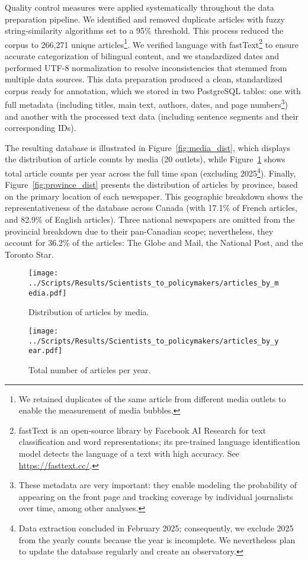 \documentclass[12pt]{article}
\begin{document}
Quality control measures were applied systematically throughout the data preparation pipeline. We identified and removed duplicate articles with fuzzy string-similarity algorithms set to a 95\% threshold. This process reduced the corpus to 266,271 unique articles\footnote{We retained duplicates of the same article from different media outlets to enable the measurement of media bubbles.}. We verified language with fastText\footnote{fastText is an open-source library by Facebook AI Research for text classification and word representations; its pre-trained language identification model detects the language of a text with high accuracy. See \url{https://fasttext.cc/}.} to ensure accurate categorization of bilingual content, and we standardized dates and performed UTF-8 normalization to resolve inconsistencies that stemmed from multiple data sources. This data preparation produced a clean, standardized corpus ready for annotation, which we stored in two PostgreSQL tables: one with full metadata (including titles, main text, authors, dates, and page numbers\footnote{These metadata are very important: they enable modeling the probability of appearing on the front page and tracking coverage by individual journalists over time, among other analyses.}) and another with the processed text data (including sentence segments and their corresponding IDs).

The resulting database is illustrated in Figure~\ref{fig:media_dist}, which displays the distribution of article counts by media (20 outlets), while Figure~\ref{fig:year_counts} shows total article counts per year across the full time span (excluding 2025\footnote{Data extraction concluded in February 2025; consequently, we exclude 2025 from the yearly counts because the year is incomplete. We nevertheless plan to update the database regularly and create an observatory.}). Finally, Figure~\ref{fig:province_dist} presents the distribution of articles by province, based on the primary location of each newspaper. This geographic breakdown shows the representativeness of the database across Canada (with 17.1\% of French articles, and 82.9\% of English articles). Three national newspapers are omitted from the provincial breakdown due to their pan-Canadian scope; nevertheless, they account for 36.2\% of the articles: The Globe and Mail, the National Post, and the Toronto Star.

\begin{figure}[!htbp]
  \centering
  \begin{minipage}[c]{0.48\textwidth}
    \centering
    \texttt{[image: ../Scripts/Results/Scientists\_to\_policymakers/articles\_by\_media.pdf]}
    \caption{Distribution of articles by media.}
    \label{fig:media_dist}
      \end{minipage}
  \hspace{0.02\textwidth}
  \begin{minipage}[c]{0.48\textwidth}
    \centering
    \texttt{[image: ../Scripts/Results/Scientists\_to\_policymakers/articles\_by\_year.pdf]}
    \caption{Total number of articles per year.}
    \label{fig:year_counts}
      \end{minipage}
\end{figure}
\end{document}

